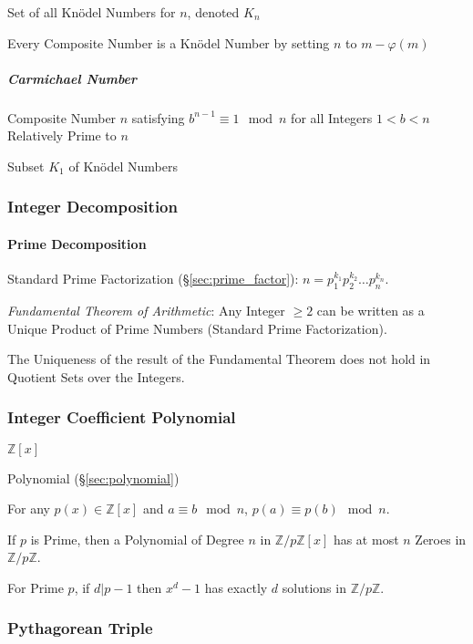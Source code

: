 Set of all Kn\"odel Numbers for $n$, denoted $K_n$

Every Composite Number is a Kn\"odel Number by setting $n$ to $m -
\varphi(m)$



\subparagraph{Carmichael Number}\label{sec:carmichael_number}\hfill

Composite Number $n$ satisfying $b^{n-1} \equiv 1 \mod n$ for all
Integers $1 < b < n$ Relatively Prime to $n$

Subset $K_1$ of Kn\"odel Numbers



\subsubsection{Integer Decomposition}\label{sec:integer_decomposition}

\paragraph{Prime Decomposition}\label{sec:prime_decomposition}\hfill

Standard Prime Factorization (\S\ref{sec:prime_factor}): $n =
p_1^{k_1} p_2^{k_2} \ldots p_n^{k_n}$.

\emph{Fundamental Theorem of Arithmetic}: Any Integer $\geq 2$ can be
written as a Unique Product of Prime Numbers (Standard Prime
Factorization).

The Uniqueness of the result of the Fundamental Theorem does not hold
in Quotient Sets over the Integers.



\subsubsection{Integer Coefficient Polynomial}
\label{sec:integer_coefficient}

$\mathbb{Z}[x]$

Polynomial (\S\ref{sec:polynomial})

For any $p(x) \in \mathbb{Z}[x]$ and $a \equiv b \mod n$, $p(a) \equiv
p(b) \mod n$.

If $p$ is Prime, then a Polynomial of Degree $n$ in
$\mathbb{Z}/p\mathbb{Z}[x]$ has at most $n$ Zeroes in
$\mathbb{Z}/p\mathbb{Z}$.

For Prime $p$, if $d|p-1$ then $x^d - 1$ has exactly $d$ solutions in
$\mathbb{Z}/p\mathbb{Z}$.



\subsubsection{Pythagorean Triple}\label{sec:pythagorean_triple}

